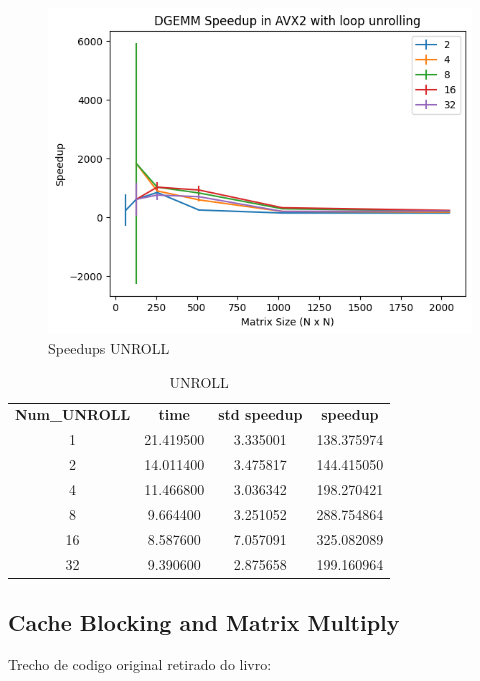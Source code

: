 \documentclass[12pt]{article}
\begin{document}
\begin{figure}[h]
    \centering
    \includegraphics[scale=0.75]{figures/speedups_unroll.png}
    \caption{Speedups UNROLL}
    \label{fig:speedups-unroll}
\end{figure}

\begin{table}[h]
    \centering
    \label{tab:unroll}
    \begin{tabular}{cccc}
        \textbf{Num\_UNROLL} & \textbf{time} & \textbf{std speedup} & \textbf{speedup} \\
        1 & 21.419500 & 3.335001 & 138.375974 \\
        2 & 14.011400 & 3.475817 & 144.415050 \\
        4 & 11.466800 & 3.036342 & 198.270421 \\
        8 & 9.664400 & 3.251052 & 288.754864 \\
        16 & 8.587600 & 7.057091 & 325.082089 \\
        32 & 9.390600 & 2.875658 & 199.160964 \\
    \end{tabular}
    \caption{UNROLL}
\end{table}

\subsection{Cache Blocking and Matrix Multiply}

Trecho de codigo original retirado do livro:
\end{document}
